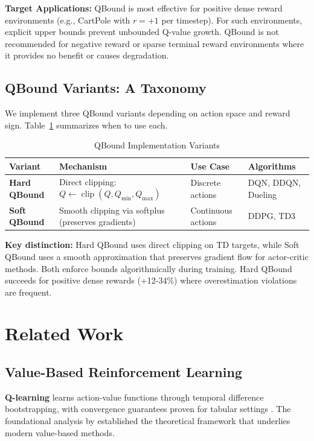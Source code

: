 \documentclass[11pt]{article}
\theoremstyle{definition}
\theoremstyle{remark}
\DeclareMathOperator{\clip}{clip}
\begin{document}
\textbf{Target Applications:} QBound is most effective for positive dense reward environments (e.g., CartPole with $r=+1$ per timestep). For such environments, explicit upper bounds prevent unbounded Q-value growth. QBound is not recommended for negative reward or sparse terminal reward environments where it provides no benefit or causes degradation.

\subsection{QBound Variants: A Taxonomy}

We implement three QBound variants depending on action space and reward sign. Table~\ref{tab:qbound-taxonomy} summarizes when to use each.

\begin{table}[h]
\centering
\caption{QBound Implementation Variants}
\label{tab:qbound-taxonomy}
\small
\begin{tabular}{p{2.5cm}p{3.5cm}p{4cm}p{3cm}}
\toprule
\textbf{Variant} & \textbf{Mechanism} & \textbf{Use Case} & \textbf{Algorithms} \\
\midrule
\textbf{Hard QBound} & Direct clipping: $Q \gets \clip(Q, Q_{\min}, Q_{\max})$ & Discrete actions & DQN, DDQN, Dueling \\
\textbf{Soft QBound} & Smooth clipping via softplus (preserves gradients) & Continuous actions & DDPG, TD3 \\
\bottomrule
\end{tabular}
\end{table}

\textbf{Key distinction:} Hard QBound uses direct clipping on TD targets, while Soft QBound uses a smooth approximation that preserves gradient flow for actor-critic methods. Both enforce bounds algorithmically during training. Hard QBound succeeds for positive dense rewards (+12-34\%) where overestimation violations are frequent.

\section{Related Work}

\subsection{Value-Based Reinforcement Learning}

\textbf{Q-learning} \citep{watkins1992q} learns action-value functions through temporal difference bootstrapping, with convergence guarantees proven for tabular settings \citep{jaakkola1994convergence, melo2001convergence}. The foundational analysis by \citet{watkins1989learning} established the theoretical framework that underlies modern value-based methods.
\end{document}
